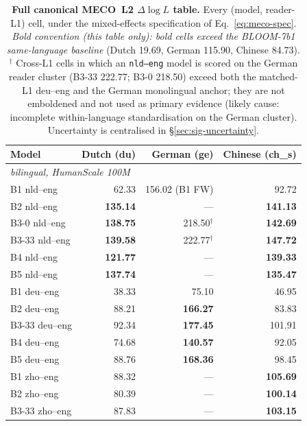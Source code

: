 \begin{table}[!ht]
  \centering \scriptsize
  \setlength{\tabcolsep}{4pt}
  \caption{\textbf{Full canonical MECO~L2 $\Delta\log L$ table.} Every (model, reader-L1) cell, under the mixed-effects specification of Eq.~\ref{eq:meco-spec}. \emph{Bold convention (this table only): bold cells exceed the BLOOM-7b1 same-language baseline} (Dutch 19.69, German 115.90, Chinese 84.73). $^{\dagger}$ Cross-L1 cells in which an \texttt{nld--eng} model is scored on the German reader cluster (B3-33 222.77; B3-0 218.50) exceed both the matched-L1 deu--eng \beetle{} and the German monolingual anchor; they are not emboldened and not used as primary evidence (likely cause: incomplete within-language standardisation on the German cluster). Uncertainty is centralised in \S\ref{sec:sig-uncertainty}.}
  \label{tab:meco_full_canonical}
  \begin{tabular}{lrrr}
    \toprule
    Model & Dutch (du) & German (ge) & Chinese (ch\_s) \\
    \midrule
    \multicolumn{4}{l}{\textit{\beetle{} bilingual, HumanScale 100M}} \\
    \midrule
    B1 nld--eng           & 62.33 & 156.02 (B1 FW) & 92.72 \\
    B2 nld--eng           & \textbf{135.14} & --- & \textbf{141.13} \\
    B3-0 nld--eng         & \textbf{138.75} & 218.50$^{\dagger}$ & \textbf{142.69} \\
    B3-33 nld--eng        & \textbf{139.58} & 222.77$^{\dagger}$ & \textbf{147.72} \\
    B4 nld--eng           & \textbf{121.77} & --- & \textbf{139.33} \\
    B5 nld--eng           & \textbf{137.74} & --- & \textbf{135.47} \\
    B1 deu--eng           & 38.33 & 75.10 & 46.95 \\
    B2 deu--eng           & 88.21 & \textbf{166.27} & 83.83 \\
    B3-33 deu--eng        & 92.34 & \textbf{177.45} & 101.91 \\
    B4 deu--eng           & 74.68 & \textbf{140.57} & 92.05 \\
    B5 deu--eng           & 88.76 & \textbf{168.36} & 98.45 \\
    B1 zho--eng           & 88.32 & --- & \textbf{105.69} \\
    B2 zho--eng           & 80.39 & --- & \textbf{100.14} \\
    B3-33 zho--eng        & 87.83 & --- & \textbf{103.15} \\

\end{tabular}
\end{table}
